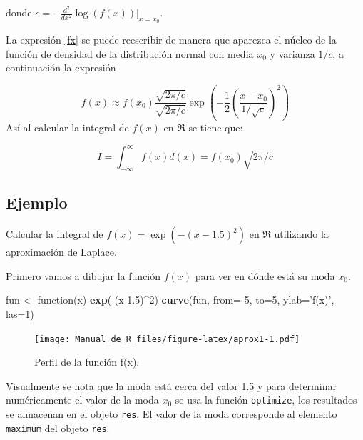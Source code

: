 \documentclass[10pt,]{krantz}
\makeatletter
\newenvironment{Shaded}{\begin{snugshade}}{\end{snugshade}}
\newcommand{\KeywordTok}[1]{\textcolor[rgb]{0.13,0.29,0.53}{\textbf{{#1}}}}
\newcommand{\DataTypeTok}[1]{\textcolor[rgb]{0.13,0.29,0.53}{{#1}}}
\newcommand{\DecValTok}[1]{\textcolor[rgb]{0.00,0.00,0.81}{{#1}}}
\newcommand{\FloatTok}[1]{\textcolor[rgb]{0.00,0.00,0.81}{{#1}}}
\newcommand{\StringTok}[1]{\textcolor[rgb]{0.31,0.60,0.02}{{#1}}}
\newcommand{\NormalTok}[1]{{#1}}
\newenvironment{kframe}{%
\medskip{}
\setlength{\fboxsep}{.8em}
 \def\at@end@of@kframe{}%
 \ifinner\ifhmode%
  \def\at@end@of@kframe{\end{minipage}}%
  \begin{minipage}{\columnwidth}%
 \fi\fi%
 \def\FrameCommand##1{\hskip\@totalleftmargin \hskip-\fboxsep
 \colorbox{shadecolor}{##1}\hskip-\fboxsep
     \hskip-\linewidth \hskip-\@totalleftmargin \hskip\columnwidth}%
 \MakeFramed {\advance\hsize-\width
   \@totalleftmargin\z@ \linewidth\hsize
   \@setminipage}}%
 {\par\unskip\endMakeFramed%
 \at@end@of@kframe}
\renewenvironment{Shaded}{\begin{kframe}}{\end{kframe}}
\makeatother
\begin{document}
donde \(c=-\frac{d^2}{dx^2} \log(f(x)) \bigg|_{x=x_0}\).

La expresión \ref{fx} se puede reescribir de manera que aparezca el
núcleo de la función de densidad de la distribución normal con media
\(x_0\) y varianza \(1/c\), a continuación la expresión

\[
f(x) \approx f(x_0) \frac{\sqrt{2 \pi / c}}{\sqrt{2 \pi / c}}  \exp \left( -\frac{1}{2} \left( \frac{x-x_0}{1/\sqrt{c}} \right)^2 \right)
\] Así al calcular la integral de \(f(x)\) en \(\Re\) se tiene que:

\begin{equation} \label{aprox_laplace}
I = \int_{-\infty}^{\infty} f(x) d(x) = f(x_0) \sqrt{2 \pi / c}
\end{equation}

\subsection*{Ejemplo}\label{ejemplo-69}


Calcular la integral de \(f(x)=\exp \left( -(x-1.5)^2 \right)\) en
\(\Re\) utilizando la aproximación de Laplace.

Primero vamos a dibujar la función \(f(x)\) para ver en dónde está su
moda \(x_0\).

\begin{Shaded}
\begin{Highlighting}[]
\NormalTok{fun <-}\StringTok{ }\NormalTok{function(x) }\KeywordTok{exp}\NormalTok{(-(x}\FloatTok{-1.5}\NormalTok{)^}\DecValTok{2}\NormalTok{)}
\KeywordTok{curve}\NormalTok{(fun, }\DataTypeTok{from=}\NormalTok{-}\DecValTok{5}\NormalTok{, }\DataTypeTok{to=}\DecValTok{5}\NormalTok{, }\DataTypeTok{ylab=}\StringTok{'f(x)'}\NormalTok{, }\DataTypeTok{las=}\DecValTok{1}\NormalTok{)}
\end{Highlighting}
\end{Shaded}

\begin{figure}[htbp]
\centering
\texttt{[image: Manual\_de\_R\_files/figure-latex/aprox1-1.pdf]}
\caption{\label{fig:aprox1}Perfil de la función f(x).}
\end{figure}

Visualmente se nota que la moda está cerca del valor 1.5 y para
determinar numéricamente el valor de la moda \(x_0\) se usa la función
\texttt{optimize}, los resultados se almacenan en el objeto
\texttt{res}. El valor de la moda corresponde al elemento
\texttt{maximum} del objeto \texttt{res}.
\end{document}

